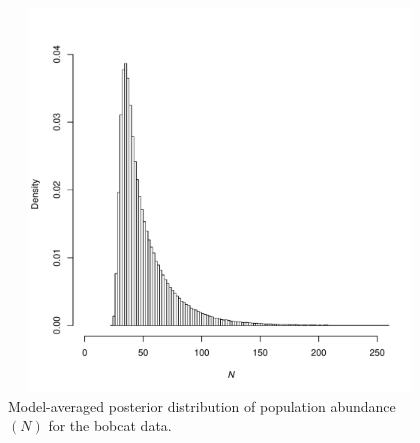 \documentclass[12pt]{article}
\begin{document}
\begin{figure}
  \includegraphics[width=6in,height=4in]{modaveN.pdf}
  \begin{doublespace}
    \caption{\label{fig:modaveN}Model-averaged posterior distribution of population abundance $(N)$ for the bobcat data.}
  \end{doublespace}
\end{figure}
\end{document}
